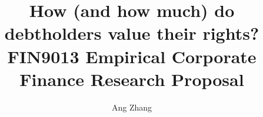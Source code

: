 \documentclass[a4paper, 10pt, authoryear]{elsarticle}
\begin{document}
\title{
  How (and how much) do debtholders value their rights? \\
  \large FIN9013 Empirical Corporate Finance Research Proposal
}
\author{Ang Zhang}


\maketitle
\end{document}
